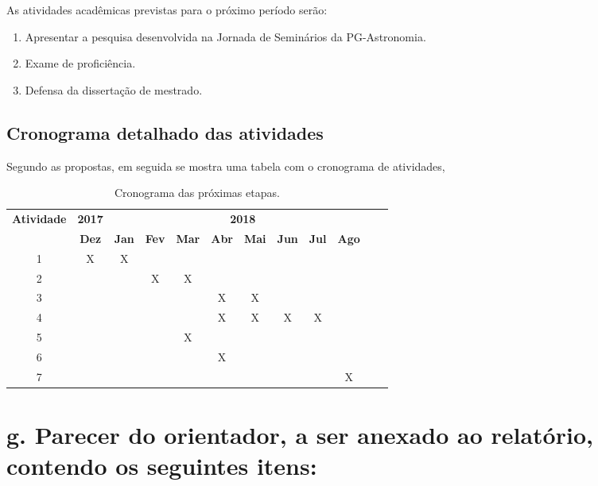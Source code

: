 \documentclass[a4paper, 11pt]{article}
\begin{document}
As atividades acadêmicas previstas para o pr\'oximo per\'iodo ser\~ao:

\begin{enumerate}[resume]
  \item Apresentar a pesquisa desenvolvida na Jornada de Seminários da PG-Astronomia.
  \item Exame de proficiência.
  \item Defensa da dissertação de mestrado.  
\end{enumerate}
\subsection{Cronograma detalhado das atividades}
Segundo as propostas, em seguida se mostra uma tabela com o cronograma de atividades,
\begin{table}[H]
\centering
\begin{tabular}{cccccccccccc}
\toprule \multirow{2}{*}{\textbf{Atividade}}& \multicolumn{1}{c}{\textbf{2017}} & \multicolumn{9}{c}{\textbf{2018}} \\ \cline{2-12}
  & \textbf{Dez} & \textbf{Jan} & \textbf{Fev} & \textbf{Mar} & \textbf{Abr} & \textbf{Mai} & \textbf{Jun} & \textbf{Jul} & \textbf{Ago} & \textbf{} & \textbf{}\\ \midrule 
1 & X & X &   &   &   &   &   &   &   &   \\ 
2 &   &   & X & X &   &   &   &   &   &   \\
3 &   &   &   &   & X & X &   &   &   &   \\ 
4 &   &   &   &   & X & X & X & X &   &   \\ 
5 &   &   &   & X &   &   &   &   &   &   \\
6 &   &   &   &   & X &   &   &   &   &   \\
7 &   &   &   &   &   &   &   &   & X &   \\ \bottomrule
\end{tabular}
\caption{Cronograma das pr\'oximas etapas.}
\label{tab:cronograma}
\end{table}

\section{g. Parecer do orientador, a ser anexado ao relatório, contendo os seguintes itens:}
\end{document}
